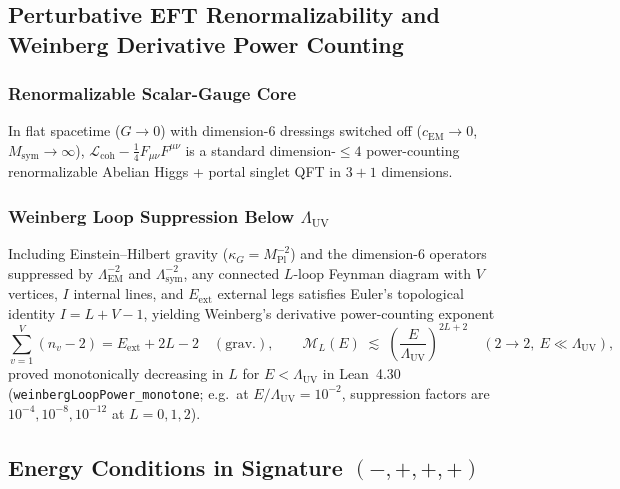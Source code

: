 \subsection{Perturbative EFT Renormalizability and Weinberg Derivative Power Counting}

\subsubsection{Renormalizable Scalar-Gauge Core}

In flat spacetime ($G \to 0$) with dimension-6 dressings switched off ($c_{\mathrm{EM}} \to 0$, $M_{\mathrm{sym}} \to \infty$), $\mathcal{L}_{\mathrm{coh}} - \frac{1}{4}F_{\mu\nu}F^{\mu\nu}$ is a standard dimension-$\le 4$ power-counting renormalizable Abelian Higgs + portal singlet QFT in $3+1$ dimensions.

\subsubsection{Weinberg Loop Suppression Below $\Lambda_{\mathrm{UV}}$}

Including Einstein--Hilbert gravity ($\kappa_G = M_{\mathrm{Pl}}^{-2}$) and the dimension-6 operators suppressed by $\Lambda_{\mathrm{EM}}^{-2}$ and $\Lambda_{\mathrm{sym}}^{-2}$, any connected $L$-loop Feynman diagram with $V$ vertices, $I$ internal lines, and $E_{\mathrm{ext}}$ external legs satisfies Euler's topological identity $I = L + V - 1$, yielding Weinberg's derivative power-counting exponent
\begin{equation}
\sum_{v=1}^V (n_v - 2) = E_{\mathrm{ext}} + 2L - 2 \quad (\text{grav.}),
\qquad
\mathcal{M}_L(E) \;\lesssim\; \left(\frac{E}{\Lambda_{\mathrm{UV}}}\right)^{2L + 2}
\quad (2 \to 2,\ E \ll \Lambda_{\mathrm{UV}}),
\label{eq:weinberg_power_counting_sec19}
\end{equation}
proved monotonically decreasing in $L$ for $E < \Lambda_{\mathrm{UV}}$ in Lean~4.30 (\texttt{weinberg\allowbreak{}Loop\allowbreak{}Power\_\allowbreak{}monotone}; e.g.\ at $E/\Lambda_{\mathrm{UV}} = 10^{-2}$, suppression factors are $10^{-4}, 10^{-8}, 10^{-12}$ at $L = 0, 1, 2$).

\subsection{Energy Conditions in Signature $(-,+,+,+)$}

